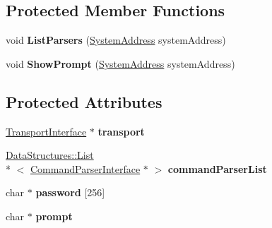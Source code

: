 \subsection*{Protected Member Functions}
\begin{DoxyCompactItemize}
\item 
\hypertarget{class_rak_net_1_1_console_server_accea9b34d2677f939eaf8bdb1aacb28f}{void {\bfseries List\-Parsers} (\hyperlink{struct_rak_net_1_1_system_address}{System\-Address} system\-Address)}\label{class_rak_net_1_1_console_server_accea9b34d2677f939eaf8bdb1aacb28f}

\item 
\hypertarget{class_rak_net_1_1_console_server_a40c9e85c01b15f2e4bd10f5f268bc947}{void {\bfseries Show\-Prompt} (\hyperlink{struct_rak_net_1_1_system_address}{System\-Address} system\-Address)}\label{class_rak_net_1_1_console_server_a40c9e85c01b15f2e4bd10f5f268bc947}

\end{DoxyCompactItemize}
\subsection*{Protected Attributes}
\begin{DoxyCompactItemize}
\item 
\hypertarget{class_rak_net_1_1_console_server_a479320d77dcce5881789be0d413f4016}{\hyperlink{class_rak_net_1_1_transport_interface}{Transport\-Interface} $\ast$ {\bfseries transport}}\label{class_rak_net_1_1_console_server_a479320d77dcce5881789be0d413f4016}

\item 
\hypertarget{class_rak_net_1_1_console_server_acd5eb859f3198e4add45e6f764a2408d}{\hyperlink{class_data_structures_1_1_list}{Data\-Structures\-::\-List}\\*
$<$ \hyperlink{class_rak_net_1_1_command_parser_interface}{Command\-Parser\-Interface} $\ast$ $>$ {\bfseries command\-Parser\-List}}\label{class_rak_net_1_1_console_server_acd5eb859f3198e4add45e6f764a2408d}

\item 
\hypertarget{class_rak_net_1_1_console_server_a43b8d777dc30bde33fd8b0bdc2e3bb08}{char $\ast$ {\bfseries password} \mbox{[}256\mbox{]}}\label{class_rak_net_1_1_console_server_a43b8d777dc30bde33fd8b0bdc2e3bb08}

\item 
\hypertarget{class_rak_net_1_1_console_server_a33c74f62ef1da4a003277f0151b92130}{char $\ast$ {\bfseries prompt}}\label{class_rak_net_1_1_console_server_a33c74f62ef1da4a003277f0151b92130}

\end{DoxyCompactItemize}


